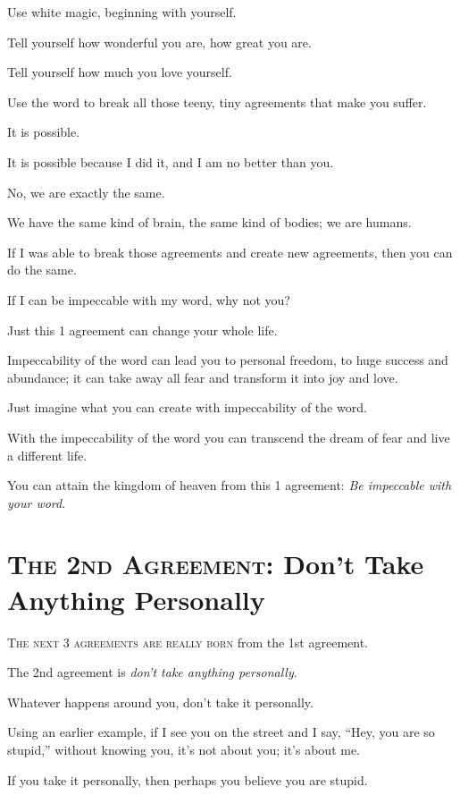 \documentclass{article}
\numberwithin{equation}{section}
\begin{document}
Use white magic, beginning with yourself.

Tell yourself how wonderful you are, how great you are.

Tell yourself how much you love yourself.

Use the word to break all those teeny, tiny agreements that make you suffer.

%
It is possible.

It is possible because I did it, and I am no better than you.

No, we are exactly the same.

We have the same kind of brain, the same kind of bodies; we are humans.

If I was able to break those agreements and create new agreements, then you can do the same.

If I can be impeccable with my word, why not you?

Just this 1 agreement can change your whole life.

Impeccability of the word can lead you to personal freedom, to huge success and abundance; it can take away all fear and transform it into joy and love.

%
Just imagine what you can create with impeccability of the word.

With the impeccability of the word you can transcend the dream of fear and live a different life.


You can attain the kingdom of heaven from this 1 agreement: \textit{Be impeccable with your word}.

\section{\textsc{The 2nd Agreement}: Don't Take Anything Personally}
\textsc{The next 3 agreements are really born} from the 1st agreement.

The 2nd agreement is \textit{don't take anything personally}.

%
Whatever happens around you, don't take it personally.

Using an earlier example, if I see you on the street and I say, ``Hey, you are so stupid,'' without knowing you, it's not about you; it's about me.

If you take it personally, then perhaps you believe you are stupid.
\end{document}
